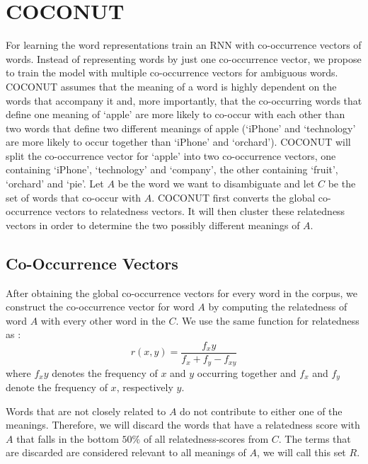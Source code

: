 \documentclass[11pt]{article}
\begin{document}
\section{COCONUT}
For learning the word representations \cite{Mikolov:13} train an RNN with co-occurrence vectors of words. Instead of representing words by just one co-occurrence vector, we propose to train the model with multiple co-occurrence vectors for ambiguous words. 
COCONUT assumes that the meaning of a word is highly dependent on the words that accompany it and, more importantly, that the co-occurring words that define one meaning of `apple' are more likely to co-occur with each other than two words that define two different meanings of apple (`iPhone' and `technology' are more likely to occur together than `iPhone' and `orchard'). COCONUT will split the co-occurrence vector for `apple' into two co-occurrence vectors, one containing `iPhone', `technology' and `company', the other containing `fruit', `orchard' and `pie'. Let $A$ be the word we want to disambiguate and let $C$ be the set of words that co-occur with $A$. COCONUT first converts the global co-occurrence vectors to relatedness vectors. It will then cluster these relatedness vectors in order to determine the two possibly different meanings of $A$. 

\subsection{Co-Occurrence Vectors}
After obtaining the global co-occurrence vectors for every word in the corpus, we construct the co-occurrence vector for word $A$ by computing the relatedness of word $A$ with every other word in the $C$. We use the same function for relatedness as \cite{Guthrie:92}:
$$r(x, y) = \frac{f_xy}{f_x+f_y - f_{xy}}$$
where $f_xy$ denotes the frequency of $x$ and $y$ occurring together and $f_x$ and $f_y$ denote the frequency of $x$, respectively $y$. 

Words that are not closely related to $A$ do not contribute to either one of the meanings. Therefore, we will discard the words that have a relatedness score with $A$ that falls in the bottom $50\%$ of all relatedness-scores from $C$. The terms that are discarded are considered relevant to all meanings of $A$, we will call this set $R$.
\end{document}
